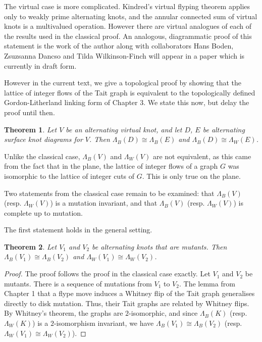 \documentclass[12pt]{report}
\newtheorem*{theorem}{Theorem}
\theoremstyle{upright}
\begin{document}
The virtual case is more complicated. Kindred's virtual flyping theorem applies only to weakly prime alternating knots, and the annular connected sum of virtual knots is a multivalued operation. However there are virtual analogues of each of the results used in the classical proof. An analogous, diagrammatic proof of this statement is the work of the author along with collaborators Hans Boden, Zsuzsanna Dancso and Tilda Wilkinson-Finch will appear in a paper which is currently in draft form.

However in the current text, we give a topological proof by showing that the lattice of integer flows of the Tait graph is equivalent to the topologically defined Gordon-Litherland linking form of Chapter 3. We state this now, but delay the proof until then.

\begin{theorem}
Let $V$ be an alternating virtual knot, and let $D$, $E$ be alternating surface knot diagrams for $V$. Then $\Lambda_{B}(D) \cong \Lambda_{B}(E)$ and $\Lambda_{B}(D) \cong \Lambda_{W}(E)$.
\end{theorem}

Unlike the classical case, $\Lambda_{B}(V)$ and $\Lambda_{W}(V)$ are not equivalent, as this came from the fact that in the plane, the lattice of integer flows of a graph $G$ was isomorphic to the lattice of integer cuts of $G$. This is only true on the plane.

Two statements from the classical case remain to be examined: that $\Lambda_{B}(V)$ (resp. $\Lambda_{W}(V)$) is a mutation invariant, and that $\Lambda_{B}(V)$ (resp. $\Lambda_{W}(V)$) is complete up to mutation.

The first statement holds in the general setting.
\begin{theorem}
Let $V_{1}$ and $V_{2}$ be alternating knots that are mutants. Then $\Lambda_{B}(V_{1}) \cong \Lambda_{B}(V_{2})$ and $\Lambda_{W}(V_{1}) \cong \Lambda_{W}(V_{2})$.
\end{theorem}
\begin{proof}
The proof follows the proof in the classical case exactly. Let $V_{1}$ and $V_{2}$ be mutants. There is a sequence of mutations from $V_{1}$ to $V_{2}$. The lemma from Chapter 1 that a flype move induces a Whitney flip of the Tait graph generalises directly to disk mutation. Thus, their Tait graphs are related by Whitney flips. By Whitney's theorem, the graphs are $2$-isomorphic, and since $\Lambda_{B}(K)$ (resp. $\Lambda_{W}(K)$) is a $2$-isomorphism invariant, we have $\Lambda_{B}(V_{1}) \cong \Lambda_{B}(V_{2})$ (resp. $\Lambda_{W}(V_{1}) \cong \Lambda_{W}(V_{2})$).
\end{proof}
\end{document}
